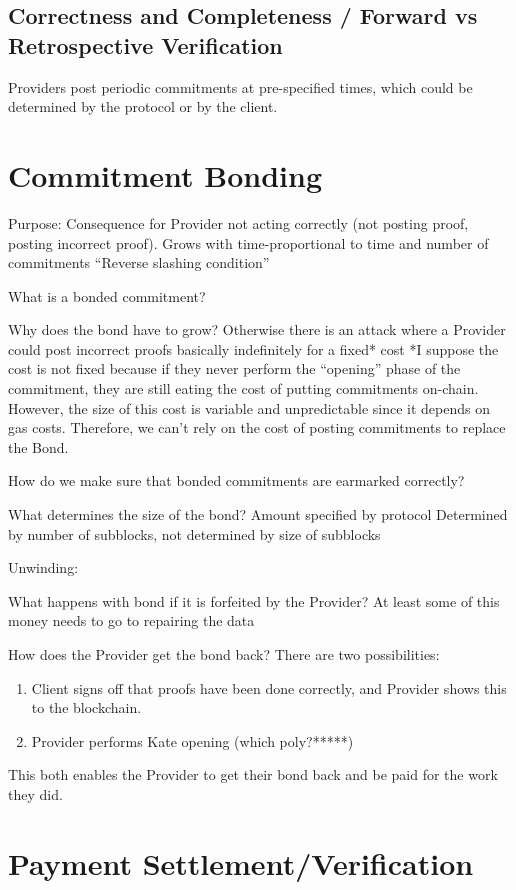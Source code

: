\documentclass{article}
\begin{document}
\subsection{Correctness and Completeness / Forward vs Retrospective Verification}

Providers post periodic commitments at pre-specified times, which could be determined by the protocol or by the client. 

\section{Commitment Bonding}

Purpose: Consequence for Provider not acting correctly (not posting proof, posting incorrect proof). 
Grows with time-proportional to time and number of commitments
“Reverse slashing condition”

What is a bonded commitment?

Why does the bond have to grow?
	Otherwise there is an attack where a Provider could post incorrect proofs basically indefinitely for a fixed* cost
	*I suppose the cost is not fixed because if they never perform the “opening” phase of the commitment, they are still eating the cost of putting commitments on-chain. However, the size of this cost is variable and unpredictable since it depends on gas costs. Therefore, we can’t rely on the cost of posting commitments to replace the Bond. 


How do we make sure that bonded commitments are earmarked correctly?

What determines the size of the bond?
Amount specified by protocol
Determined by number of subblocks, not determined by size of subblocks

Unwinding:

What happens with bond if it is forfeited by the Provider?
At least some of this money needs to go to repairing the data

How does the Provider get the bond back? There are two possibilities:
\begin{enumerate}
    \item Client signs off that proofs have been done correctly, and Provider shows this to the blockchain. 
    \item Provider performs Kate opening (which poly?*****)
\end{enumerate}
This both enables the Provider to get their bond back and be paid for the work they did.

\section{Payment Settlement/Verification}
\end{document}
